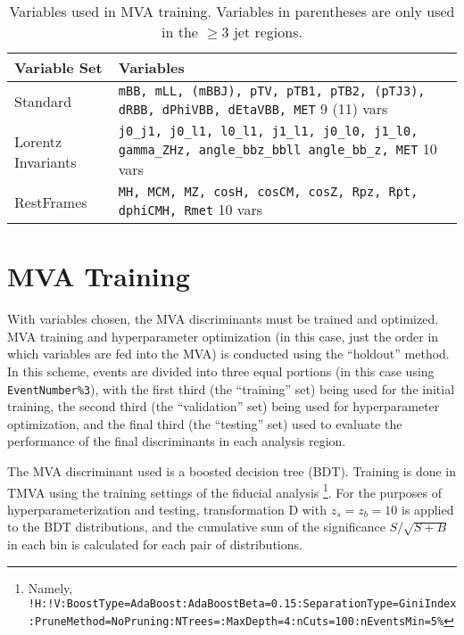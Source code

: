 \begin{table}[!htbp]\captionsetup{justification=centering}
  \begin{center}
    \caption{Variables used in MVA training.  Variables in parentheses are only used in the $\ge 3$ jet regions.}
    \label{tab:variables}
    \begin{tabular}{l|p{4.5in}}
      \hline\hline
      Variable Set & Variables\\
      \hline
      Standard & \texttt{mBB,\- mLL, (mBBJ),\- pTV,\- pTB1,\- pTB2,\- (pTJ3),\- dRBB,\- dPhiVBB,\- dEtaVBB,\- MET} 9 (11) vars\\
      Lorentz Invariants &  \texttt{j0\_j1,\- j0\_l1,\- l0\_l1,\- j1\_l1,\- j0\_l0,\- j1\_l0,\- gamma\_ZHz,\- angle\_bbz\_bbll\- angle\_bb\_z,\- MET} 10 vars\\
      RestFrames & \texttt{MH,\- MCM,\- MZ,\- cosH,\- cosCM,\- cosZ,\- Rpz,\- Rpt,\- dphiCMH,\- Rmet} 10 vars\\
      \hline\hline
    \end{tabular}
  \end{center}
\end{table}



\section{MVA Training}
\label{sec:mvatra}
With variables chosen, the MVA discriminants must be trained and optimized.  MVA training and hyperparameter optimization (in this case, just the order in which variables are fed into the MVA) is conducted using the ``holdout'' method.
  In this scheme, events are divided into three equal portions (in this case using \texttt{EventNumber\%3}), with the first third (the ``training'' set) being used for the initial training, the second third (the ``validation'' set) being used for hyperparameter optimization, and the final third (the ``testing'' set) used to evaluate the performance of the final discriminants in each analysis region.

The MVA discriminant used is a boosted decision tree (BDT).  Training is done in TMVA using the training settings of the fiducial analysis \cite{supportnote}\footnote{Namely, \texttt{!H:\-!V:\-BoostType=\-AdaBoost:\-AdaBoostBeta=0.15:\-SeparationType=\-GiniIndex:\-PruneMethod=\-NoPruning:\-NTrees=:\-MaxDepth=4:\-nCuts=100:\-nEventsMin=5\%}}.  For the purposes of hyperparameterization and testing, transformation D with $z_s=z_b=10$ is applied to the BDT distributions, and the cumulative sum of the significance $S/\sqrt{S+B}$ in each bin is calculated for each pair of distributions.  

